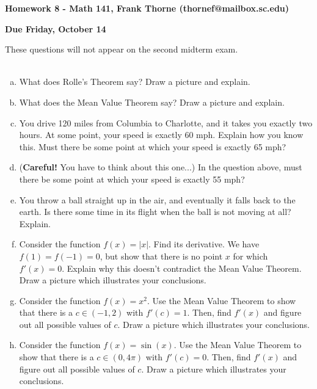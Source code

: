 \documentclass[12pt]{article}
\begin{document}
\setlength{\topmargin}{-2mm}





\begin{center}{\bf Homework 8 - Math 141, Frank Thorne (thornef@mailbox.sc.edu)}
\end{center}
\begin{center}
{\bf Due Friday, October 14}
\end{center}

These questions will not appear on the second midterm exam. 
\\
\\
\begin{enumerate}[(a)]
\item
What does Rolle's Theorem say? Draw a picture and explain.

\item
What does the Mean Value Theorem say? Draw a picture and explain.

\item
You drive 120 miles from Columbia to Charlotte, and it takes you exactly two hours.
At some point, your speed is exactly 60 mph. Explain how you know this. Must there be
some point at which your speed is exactly 65 mph?

\item
({\bf Careful!} You have to think about this one...) In the question above, must there
be some point at which your speed is exactly 55 mph?

\item
You throw a ball straight up in the air, and eventually it falls back to the earth.
Is there some time in its flight when the ball is not moving at all? Explain.

\item
Consider the function $f(x) = |x|$. Find its derivative. We have $f(1) = f(-1) = 0$,
but show that there is no point $x$ for which $f'(x) = 0$. Explain why this doesn't contradict
the Mean Value Theorem. Draw a picture which illustrates your conclusions.

\item
Consider the function $f(x) = x^2$. Use the Mean Value Theorem to show
that there is a $c \in (-1, 2)$ with $f'(c) = 1$. Then, find $f'(x)$ and figure
out all possible values of $c$. Draw a picture which illustrates your conclusions.

\item
Consider the function $f(x) = \sin(x)$. Use the Mean Value Theorem to show
that there is a $c \in (0, 4\pi)$ with $f'(c) = 0$. Then, find $f'(x)$ and figure
out all possible values of $c$. Draw a picture which illustrates your conclusions.


\end{enumerate}
\end{document}
